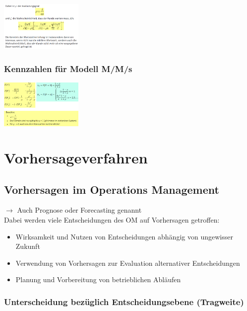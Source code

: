 \documentclass{report}
\newenvironment{Figure}
	{\par\medskip\noindent\minipage{\linewidth}}
	{\endminipage\par\medskip}
\theoremstyle{definition}
\theoremstyle{example}
\begin{document}
\begin{Figure}
\centering
\includegraphics[width=150px]{img/VerteilungWartezeitMMSII.png}
	\label{fig:Verteilung der Wartezeit (II) für das Modell M/M/s}
\end{Figure}

   \subsection{Kennzahlen für Modell M/M/s}
\begin{Figure}
\centering
\includegraphics[width=150px]{img/KennzahlenMMs.png}
	\label{fig:Überblick der Kennzahlen für das Modell MMs}
\end{Figure}


\chapter{Vorhersageverfahren}

\section{Vorhersagen im Operations Management}
$\rightarrow$ Auch Prognose oder Forecasting genannt\\
Dabei werden viele Entscheidungen des OM auf Vorhersagen getroffen:
\begin{itemize}
   \item Wirksamkeit und Nutzen von Entscheidungen abhängig von ungewisser Zukunft
   \item Verwendung von Vorhersagen zur Evaluation alternativer Entscheidungen
   \item Planung und Vorbereitung von betrieblichen Abläufen
\end{itemize}

   \subsection{Unterscheidung bezüglich Entscheidungsebene (Tragweite)}
\end{document}
